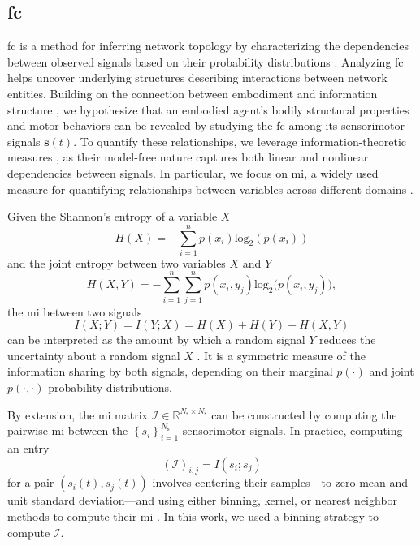 \subsection{\Acl{fc}}
\ac{fc} is a method for inferring network topology by characterizing the dependencies between observed signals based on their probability distributions \cite{Friston2011Functionaleffectiveconnectivity}. Analyzing \ac{fc} helps uncover underlying structures describing interactions between network entities. Building on the connection between embodiment and information structure \cite{Pfeifer2007Selforganizationembodiment}, we hypothesize that an embodied agent’s bodily structural properties and motor behaviors can be revealed by studying the \ac{fc} among its sensorimotor signals $\bm{s}(t)$. To quantify these relationships, we leverage information-theoretic measures \cite{Bonsignorio2020EntropyBasedMetrics,Bonsignorio2013Quantifyingevolutionaryself}, as their model-free nature captures both linear and nonlinear dependencies between signals. In particular, we focus on \ac{mi}, a widely used measure for quantifying relationships between variables across different domains \cite{Steuer2002mutualinformationdetecting}.

Given the Shannon's entropy of a variable $X$  
\begin{equation}\label{eq:entropy}
	H(X) = -\sum_{i=1}^{n}p(x_i)\text{log}_2\left(p\left(x_i\right)\right)
\end{equation}
and the joint entropy between two variables $ X $ and $ Y $ 
\begin{equation}\label{eq:joint_entropy}
	H(X,Y) = -\sum_{i=1}^{n}\sum_{j=1}^{n} p(x_i,y_j)\text{log}_2\big(p\left(x_i,y_j\right)\big),
\end{equation}
the \ac{mi} between two signals 
\begin{equation}\label{eq:mutual_information}
	I\left(X;Y\right) =I\left(Y;X\right) = H(X) + H(Y) - H(X,Y)
\end{equation}
can be interpreted as the amount by which a random signal $ Y $ reduces the uncertainty about a random signal $ X $ \cite{Cover1999Elementsinformationtheory}. It is a symmetric measure of the information sharing by both signals, depending on their marginal $p(\cdot)$ and joint $p(\cdot,\cdot)$ probability distributions.

By extension, the \ac{mi} matrix $\bm{\mathcal{I}} \in \mathbb{R}^{{N_\text{s}} \times {N_\text{s}}}$ can be constructed by computing the pairwise \ac{mi} between the $\left\lbrace s_i\right\rbrace^{N_\text{s}}_{i=1}$ sensorimotor signals. In practice, computing an entry
\begin{equation}\label{eq:adjacency_mi}
	\left(\bm{\mathcal{I}}\right)_{i,j} = I(s_i;s_j)
\end{equation}
for a pair $\left({s}_i(t),{s}_j(t)\right)$ involves centering their samples---to zero mean and unit standard deviation---and using either binning, kernel, or nearest neighbor methods to compute their \ac{mi} \cite{WaltersWilliams2009Estimationmutualinformation}. In this work, we used a binning strategy to compute $\bm{\mathcal{I}}$. 

